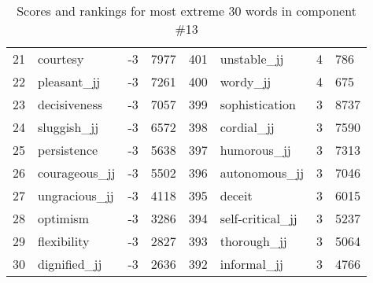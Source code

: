 \begin{table}[tbp]
\begin{tabular}{| rlr@{.}l | rlr@{.}l |}
    21 & courtesy & -3 & 7977    &    401 & unstable\_jj & 4 & 786 \\
    22 & pleasant\_jj & -3 & 7261    &    400 & wordy\_jj & 4 & 675 \\
    23 & decisiveness & -3 & 7057    &    399 & sophistication & 3 & 8737 \\
    24 & sluggish\_jj & -3 & 6572    &    398 & cordial\_jj & 3 & 7590 \\
    25 & persistence & -3 & 5638    &    397 & humorous\_jj & 3 & 7313 \\
    26 & courageous\_jj & -3 & 5502    &    396 & autonomous\_jj & 3 & 7046 \\
    27 & ungracious\_jj & -3 & 4118    &    395 & deceit & 3 & 6015 \\
    28 & optimism & -3 & 3286    &    394 & self-critical\_jj & 3 & 5237 \\
    29 & flexibility & -3 & 2827    &    393 & thorough\_jj & 3 & 5064 \\
    30 & dignified\_jj & -3 & 2636    &    392 & informal\_jj & 3 & 4766 \\
    \hline
    \end{tabular}
    \caption{Scores and rankings for most extreme 30 words in component \#13} 
\end{table}
\clearpage
